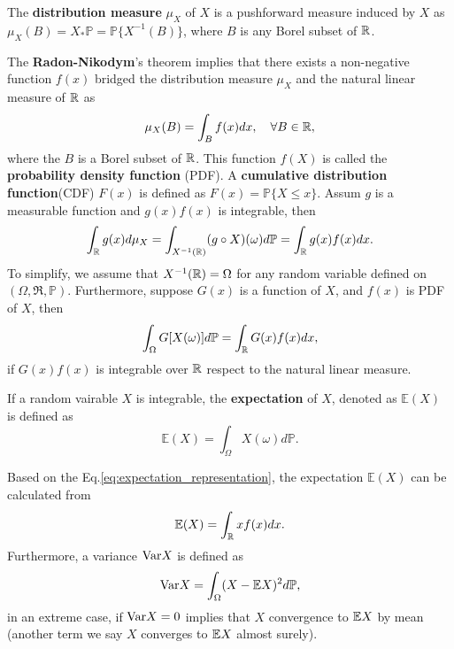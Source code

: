 \begin{definition}
The \textbf{distribution measure} $\mu_X$ of $X$ is a pushforward measure induced by $X$ as $\mu_X(B)=X_*\mathbb{P}=\mathbb{P}\{X^{-1}(B)\}$, where $B$ is any Borel subset of $\mathbb{R}$.
\end{definition}
The \textbf{Radon-Nikodym}'s theorem implies that there exists a non-negative function $f(x)$ bridged the distribution measure $\mu_X$ and the natural linear measure of $\mathbb{R}$ as
\begin{equation}
\mu_X(B) = \int_B f(x)d x, \quad\forall B\in\mathbb{R},
\end{equation} 
where the $B$ is a Borel subset of $\mathbb{R}$. This function $f(X)$ is called the \textbf{probability density function} (PDF). A \textbf{cumulative distribution function}(CDF) $F(x)$ is defined as $F(x)=\mathbb{P}\{X\le x\}$.
Assum $g$ is a measurable function and $g(x)f(x)$ is integrable, then
\begin{equation}
\int_{\mathbb{R}} g(x)d\mu_X=\int_{X^{-1}(\mathbb{R})}(g\circ X)(\omega)d\mathbb{P}=\int_{\mathbb{R}} g(x)f(x)dx.
\end{equation}
To simplify, we assume that $X^{-1}(\mathbb{R})=\Omega$ for any random variable defined on $(\Omega,\mathfrak{R},\mathbb{P})$. Furthermore, suppose $G(x)$ is a function of $X$, and $f(x)$ is PDF of $X$, then
\begin{equation}
\int_\Omega G[X(\omega)]d\mathbb{P} = \int_{\mathbb{R}} G(x)f(x)dx,
\label{eq:expectation_representation}
\end{equation}
if $G(x)f(x)$ is integrable over $\mathbb{R}$ respect to the natural linear measure.

\begin{definition}
If a random vairable $X$ is integrable, the \textbf{expectation} of $X$, denoted as $\mathbb{E}(X)$ is defined as
	\begin{equation}
	\mathbb{E}(X)=\int_{\Omega}X(\omega) d\mathbb{P}.
	\end{equation}
\end{definition}
Based on the Eq.\ref{eq:expectation_representation}, the expectation $\mathbb{E}(X)$ can be calculated from
\begin{equation}
\mathbb{E}(X)=\int_{\mathbb{R}} xf(x)dx.
\end{equation}
Furthermore, a variance $\text{Var} X$ is defined as
\begin{equation}
\text{Var} X=\int_\Omega (X-\mathbb{E} X)^2d\mathbb{P},
\end{equation}
in an extreme case, if $\text{Var} X=0$ implies that $X$ convergence to $\mathbb{E} X$ by mean (another term we say $X$ converges to $\mathbb{E} X$ almost surely).

